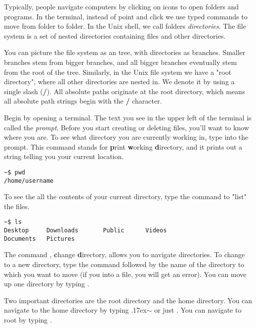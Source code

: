 Typically, people navigate computers by clicking on icons to open folders and programs.
In the terminal, instead of point and click we use typed commands to move from folder to folder.
In the Unix shell, we call folders \emph{directories}.
The file system is a set of nested directories containing files and other directories.

You can picture the file system as an tree, with directories as branches. Smaller branches stem from bigger branches, and all bigger branches eventually stem from the root of the tree. Similarly, in the Unix file system we have a "root directory", where all other directories are nested in. We denote it by using a single slash (\textbf{/}). All absolute paths originate at the root directory, which means all absolute path strings begin with the \textbf{/} character.

Begin by opening a terminal.
The text you see in the upper left of the terminal is called the \emph{prompt}.
Before you start creating or deleting files, you'll want to know where you are.
To see what directory you are currently working in, type  into the prompt.
This command stands for \textbf{p}rint \textbf{w}orking \textbf{d}irectory, and it prints out a string telling you your current location.

\begin{lstlisting}
~$ pwd
/home/username
\end{lstlisting}

To see the all the contents of your current directory, type the command  to "list" the files.

\begin{lstlisting}
~$ ls
Desktop		Downloads		Public 		Videos
Documents 	Pictures
\end{lstlisting}

The command , \textbf{c}hange \textbf{d}irectory, allows you to navigate directories.
To change to a new directory, type the  command followed by the name of the directory to which you want to move (if you  into a file, you will get an error).
You can move up one directory by typing .

Two important directories are the root directory and the home directory.
You can navigate to the home directory by typing  \raise.17ex\hbox{$\scriptstyle\sim$} or just .
You can navigate to root by typing .

